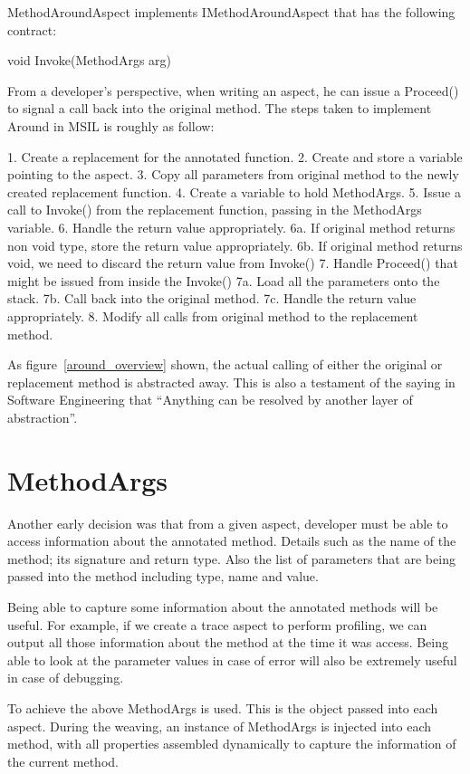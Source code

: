 MethodAroundAspect implements IMethodAroundAspect that has the following contract:

void Invoke(MethodArgs arg)

From a developer’s perspective, when writing an aspect, he can issue a Proceed() to signal a call back into the original method. The steps taken to implement Around in MSIL is roughly as follow:

1. Create a replacement for the annotated function.
2. Create and store a variable pointing to the aspect.
3. Copy all parameters from original method to the newly created replacement function.
4. Create a variable to hold MethodArgs.
5. Issue a call to Invoke() from the replacement function, passing in the MethodArgs variable.
6. Handle the return value appropriately.
   6a. If original method returns non void type, store the return value appropriately.
   6b. If original method returns void, we need to discard the return value from Invoke()
7. Handle Proceed() that might be issued from inside the Invoke()
   7a. Load all the parameters onto the stack.
   7b. Call back into the original method.
   7c. Handle the return value appropriately.
8. Modify all calls from original method to the replacement method.

As figure~\ref{around_overview} shown, the actual calling of either the original or replacement method is abstracted away. This is also a testament of the saying in Software Engineering that “Anything can be resolved by another layer of abstraction”.

\section{MethodArgs}

Another early decision was that from a given aspect, developer must be able to access information about the annotated method. Details such as the name of the method; its signature and return type. Also the list of parameters that are being passed into the method including type, name and value.

Being able to capture some information about the annotated methods will be useful. For example, if we create a trace aspect to perform profiling, we can output all those information about the method at the time it was access. Being able to look at the parameter values in case of error will also be extremely useful in case of debugging.

To achieve the above MethodArgs is used. This is the object passed into each aspect. During the weaving, an instance of MethodArgs is injected into each method, with all properties assembled dynamically to capture the information of the current method.

